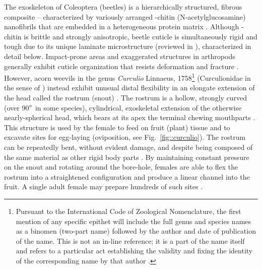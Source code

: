 \documentclass[twocolumn, linenumbers, superscriptaddress, nofootinbib]{revtex4-1}
\begin{document}
	The exoskeleton of Coleoptera (beetles) is a hierarchically structured, fibrous composite -- characterized by variously arranged \textalpha-chitin (N-acetylglucosamine) nanofibrils that are embedded in a heterogeneous protein matrix \cite{Hepburn1973, Jansen2016, Vincent2004}.
	Although \textalpha-chitin is brittle and strongly anisotropic, beetle cuticle is simultaneously rigid and tough due to its unique laminate microstructure (reviewed in \cite{Kamp2010, Kamp2015, Neville1976}), characterized in detail below.
	Impact-prone areas and exaggerated structures in arthropods generally exhibit cuticle organization that resists deformation and fracture \cite{Amini2015, Mccullough2014mech, Mccullough2014struc, Dirks2012, Dirks2013}.
	However, acorn weevils in the genus \textit{Curculio} Linnaeus, 1758\footnote{
		Pursuant to the International Code of Zoological Nomenclature, the first mention of any specific epithet will include the full genus and species names as a binomen (two-part name) followed by the author and date of publication of the name.
		This is not an in-line reference; it is a part of the name itself and refers to a particular act establishing the validity and fixing the identity of the corresponding name by that author \cite{ICZN1999}.}
	(Curculionidae in the sense of \cite{Davis2014}) instead exhibit unusual distal flexibility in an elongate extension of the head called the rostrum (snout) \cite{Toju2005, Jansen2016, Singh2016, Gibson1969}.
	The rostrum is a hollow, strongly curved (over 90$\degree$ in some species), cylindrical, exoskeletal extension of the otherwise nearly-spherical head, which bears at its apex the terminal chewing mouthparts \cite{Morimoto2003, Ting1933, Ting1936, Dennell1942, Gibson1969}.
	This structure is used by the female to feed on fruit (plant) tissue and to excavate sites for egg-laying (oviposition, see Fig.~\ref{fig::curculio}).
	The rostrum can be repeatedly bent, without evident damage, and despite being composed of the same material as other rigid body parts \cite{Jansen2016, Singh2016, Gibson1969, Toju2005}.
	By maintaining constant pressure on the snout and rotating around the bore-hole, females are able to flex the rostrum into a straightened configuration and produce a linear channel into the fruit.
	A single adult female may prepare hundreds of such sites \cite{Toju2005, Moffett1989, AguirreUribe1978}.
	
\end{document}
